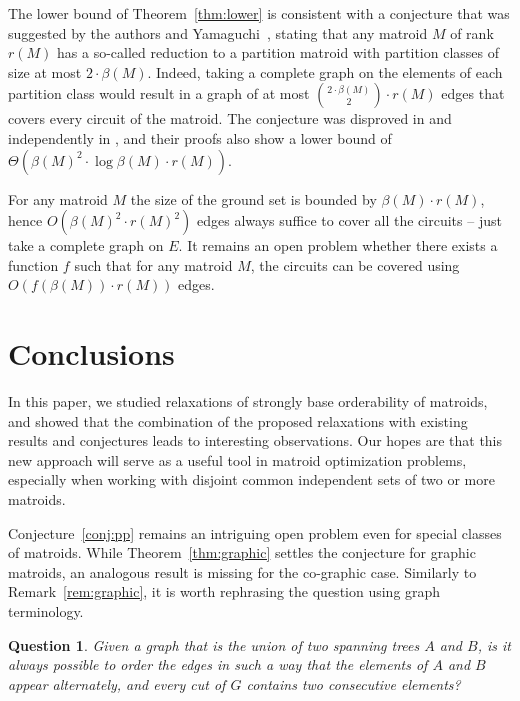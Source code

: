 \documentclass[11pt,a4paper]{article}
\theoremstyle{plain}
\newtheorem{qu}{Question}
\theoremstyle{definition}
\begin{document}
The lower bound of Theorem~\ref{thm:lower} is consistent with a conjecture that was suggested by the authors and Yamaguchi~\cite{berczi2021list}, stating that any matroid $M$ of rank $r(M)$ has a so-called reduction to a partition matroid with partition classes of size at most $2\cdot \beta(M)$. Indeed, taking a complete graph on the elements of each partition class would result in a graph of at most ${2\cdot \beta(M) \choose 2}\cdot r(M)$ edges that covers every circuit of the matroid. The conjecture was disproved in \cite{abolazimi2021matroid} and independently in \cite{leichter2022impossibility}, and their proofs also show a lower bound of $\Theta\left(\beta(M)^2\cdot\log\beta(M)\cdot r(M)\right)$. 

For any matroid $M$ the size of the ground set is bounded by $\beta(M)\cdot r(M)$, hence $O(\beta(M)^2\cdot r(M)^2)$ edges always suffice to cover all the circuits -- just take a complete graph on $E$. It remains an open problem whether there exists a function $f$ such that for any matroid $M$, the circuits can be covered using $O(f(\beta(M))\cdot r(M))$ edges.

\section{Conclusions}
\label{sec:conc}

In this paper, we studied relaxations of strongly base orderability of matroids, and showed that the combination of the proposed relaxations with existing results and conjectures leads to interesting observations. Our hopes are that this new approach will serve as a useful tool in matroid optimization problems, especially when working with disjoint common independent sets of two or more matroids. 

Conjecture~\ref{conj:pp} remains an intriguing open problem even for special classes of matroids. While Theorem~\ref{thm:graphic} settles the conjecture for graphic matroids, an analogous result is missing for the co-graphic case. Similarly to Remark~\ref{rem:graphic}, it is worth rephrasing the question using graph terminology. 

\begin{qu}
Given a graph that is the union of two spanning trees $A$ and $B$, is it always possible to order the edges in such a way that the elements of $A$ and $B$ appear alternately, and every cut of $G$ contains two consecutive elements?
\end{qu}
\end{document}
